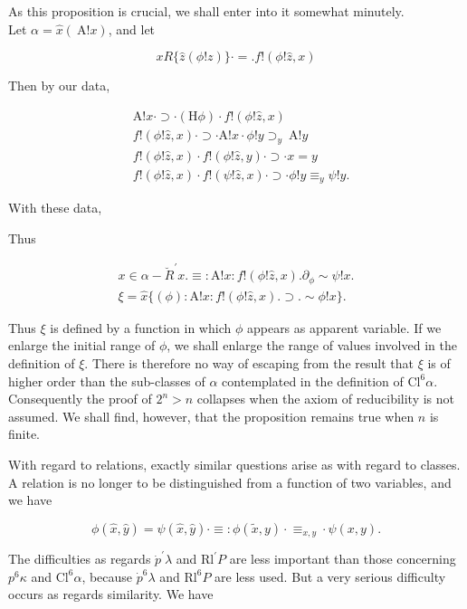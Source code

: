 \documentclass[10pt]{article}
\begin{document}
As this proposition is crucial, we shall enter into it somewhat minutely.\\
Let $\alpha=\hat{x}(\mathrm{~A}!x)$, and let

$$
x R\{\hat{z}(\phi!z)\} \cdot=. f!(\phi!\hat{z}, x)
$$

Then by our data,

$$
\begin{aligned}
& \mathrm{A}!x \cdot \supset \cdot(\mathrm{H} \phi) \cdot f!(\phi!\hat{z}, x) \\
& f!(\phi!\hat{z}, x) \cdot \supset \cdot \mathrm{A}!x \cdot \phi!y \supset_{y} \mathrm{~A}!y \\
& f!(\phi!\hat{z}, x) \cdot f!(\phi!\hat{z}, y) \cdot \supset \cdot x=y \\
& f!(\phi!\hat{z}, x) \cdot f!(\psi!\hat{z}, x) \cdot \supset \cdot \phi!y \equiv_{y} \psi!y .
\end{aligned}
$$

With these data,

Thus

$$
\begin{gathered}
x \in \alpha-\breve{R}^{\prime} x . \equiv: \mathrm{A}!x: f!(\phi!\hat{z}, x) . \partial_{\phi} \sim \psi!x . \\
\xi=\widehat{x}\{(\phi): \mathrm{A}!x: f!(\phi!\widehat{z}, x) . \supset . \sim \phi!x\} .
\end{gathered}
$$

Thus $\xi$ is defined by a function in which $\phi$ appears as apparent variable. If we enlarge the initial range of $\phi$, we shall enlarge the range of values involved in the definition of $\xi$. There is therefore no way of escaping from the result that $\xi$ is of higher order than the sub-classes of $\alpha$ contemplated in the definition of $\mathrm{Cl}^{6} \alpha$. Consequently the proof of $2^{n}>n$ collapses when the axiom of reducibility is not assumed. We shall find, however, that the proposition remains true when $n$ is finite.

With regard to relations, exactly similar questions arise as with regard to classes. A relation is no longer to be distinguished from a function of two variables, and we have

$$
\phi(\hat{x}, \hat{y})=\psi(\hat{x}, \hat{y}) \cdot \equiv: \phi(\tilde{x}, y) \cdot \equiv_{x, y} \cdot \psi(x, y) .
$$

The difficulties as regards $\dot{p}^{\prime} \lambda$ and $\mathrm{Rl}^{\prime} P$ are less important than those concerning $p^{6} \kappa$ and $\mathrm{Cl}^{6} \alpha$, because $\dot{p}^{6} \lambda$ and $\mathrm{Rl}^{6} P$ are less used. But a very serious difficulty occurs as regards similarity. We have
\end{document}
